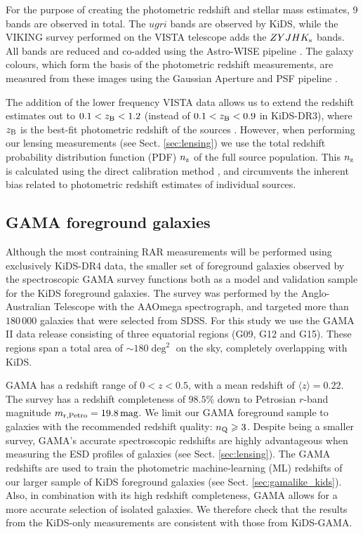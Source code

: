 \documentclass[usenatbib]{mnras}
\newcommand{\magn}{\, {\rm mag} }
\newcommand*{\meanb}[1]{\langle{#1}\rangle}
\newcommand{\un}[1]{_{\rm #1}}
\begin{document}
For the purpose of creating the photometric redshift and stellar mass estimates, 9 bands are observed in total. The $ugri$ bands are observed by KiDS, while the VIKING survey \cite[]{edge2013} performed on the VISTA telescope adds the $ZYJHK\un{s}$ bands. All bands are reduced and co-added using the Astro-WISE pipeline \cite[AW,][]{mcfarland2013}. The galaxy colours, which form the basis of the photometric redshift measurements, are measured from these images using the Gaussian Aperture and PSF pipeline \cite[GAaP,][]{kuijken2008,kuijken2015}.

The addition of the lower frequency VISTA data allows us to extend the redshift estimates out to $0.1<z\un{B}<1.2$ (instead of $0.1<z\un{B}<0.9$ in KiDS-DR3), where $z\un{B}$ is the best-fit photometric redshift of the sources \cite[]{benitez2000,hildebrandt2012}. However, when performing our lensing measurements (see Sect. \ref{sec:lensing}) we use the total redshift probability distribution function (PDF) $n\un{z}$ of the full source population. This $n\un{z}$ is calculated using the direct calibration method \cite[DIR,][]{hildebrandt2017}, and circumvents the inherent bias related to photometric redshift estimates of individual sources.

\subsection{GAMA foreground galaxies}
\label{sec:gama}

Although the most contraining RAR measurements will be performed using exclusively KiDS-DR4 data, the smaller set of foreground galaxies observed by the spectroscopic GAMA survey \cite[]{driver2011} functions both as a model and validation sample for the KiDS foreground galaxies. The survey was performed by the Anglo-Australian Telescope with the AAOmega spectrograph, and targeted more than $180 \, 000$ galaxies that were selected from SDSS. For this study we use the GAMA II data release \cite[]{liske2015} consisting of three equatorial regions (G09, G12 and G15). These regions span a total area of $\sim180 \deg^2$ on the sky, completely overlapping with KiDS.

GAMA has a redshift range of $0<z<0.5$, with a mean redshift of $\meanb{z}=0.22$. The survey has a redshift completeness of $98.5\%$ down to Petrosian $r$-band magnitude $m\un{r,Petro} = 19.8 \magn$. We limit our GAMA foreground sample to galaxies with the recommended redshift quality: $n\un{Q}\geq3$. Despite being a smaller survey, GAMA's accurate spectroscopic redshifts are highly advantageous when measuring the ESD profiles of galaxies (see Sect. \ref{sec:lensing}). The GAMA redshifts are used to train the photometric machine-learning (ML) redshifts of our larger sample of KiDS foreground galaxies (see Sect. \ref{sec:gamalike_kids}). Also, in combination with its high redshift completeness, GAMA allows for a more accurate selection of isolated galaxies. We therefore check that the results from the KiDS-only measurements are consistent with those from KiDS-GAMA.
\end{document}
